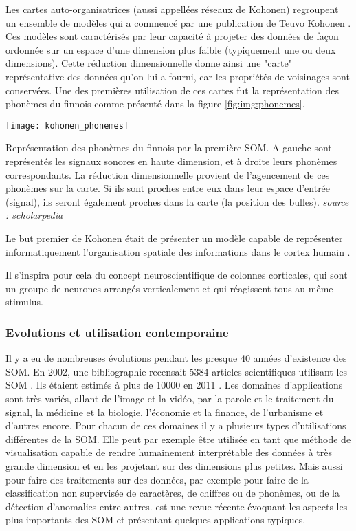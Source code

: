 	Les cartes auto-organisatrices (aussi appellées réseaux de Kohonen) regroupent un ensemble de modèles qui a commencé par une publication de Teuvo Kohonen \cite{kohonen-som82}. Ces modèles sont caractérisés par leur capacité à projeter des données de façon ordonnée sur un espace d'une dimension plus faible (typiquement une ou deux dimensions). Cette réduction dimensionnelle donne ainsi une "carte" représentative des données qu'on lui a fourni, car les propriétés de voisinages sont conservées. Une des premières utilisation de ces cartes fut la représentation des phonèmes du finnois comme présenté dans la figure \ref{fig:img:phonemes}.

	\begin{figureth}
		\texttt{[image: kohonen\_phonemes]}
		\caption[Phonème SOM]{Représentation des phonèmes du finnois par la première SOM. A gauche sont représentés les signaux sonores en haute dimension, et à droite leurs phonèmes correspondants. La réduction dimensionnelle provient de l'agencement de ces phonèmes sur la carte. Si ils sont proches entre eux dans leur espace d'entrée (signal), ils seront également proches dans la carte (la position des bulles). \textit{source : scholarpedia}}\label{fig:img:phonemes}

	\end{figureth}

	Le but premier de Kohonen était de présenter un modèle capable de représenter informatiquement l'organisation spatiale des informations dans le cortex humain \cite{kohonen-memory}. 
	
	Il s'inspira pour cela du concept neuroscientifique de colonnes corticales, qui sont un groupe de neurones arrangés verticalement et qui réagissent tous au même stimulus.

\subsubsection{Evolutions et utilisation contemporaine}
	Il y a eu de nombreuses évolutions pendant les presque 40 années d'existence des SOM. En 2002, une bibliographie recensait 5384 articles scientifiques utilisant les SOM \cite{oja2003bibliography}. Ils étaient estimés à plus de 10000 en 2011 \cite{bilbiography-finuni}. Les domaines d'applications sont très variés, allant de l'image et la vidéo, par la parole et le traitement du signal, la médicine et la biologie, l'économie et la finance, de l'urbanisme et d'autres encore. Pour chacun de ces domaines il y a plusieurs types d'utilisations différentes de la SOM. Elle peut par exemple être utilisée en tant que méthode de visualisation capable de rendre humainement interprétable des données à très grande dimension et en les projetant sur des dimensions plus petites. Mais aussi pour faire des traitements sur des données, par exemple pour faire de la classification non supervisée de caractères, de chiffres ou de phonèmes, ou de la détection d'anomalies entre autres. \cite{cottrell2018self} est une revue récente évoquant les aspects les plus importants des SOM et présentant quelques applications typiques. 

